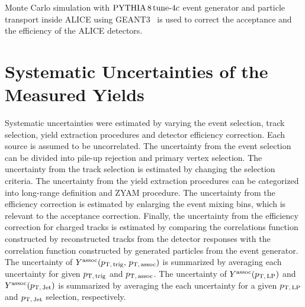 Monte Carlo simulation with $\mathrm{PYTHIA}\,8\,\mathrm{tune}{\text -}4c$ event generator and particle transport inside ALICE using GEANT3~\cite{Brun:1994aa} is used to correct the acceptance and the efficiency of the ALICE detectors. 


\section{Systematic Uncertainties of the Measured Yields}
\label{sec:uncertainties}
Systematic uncertainties were estimated by varying the event selection, track selection, yield extraction procedures and detector efficiency correction. Each source is assumed to be uncorrelated. The uncertainty from the event selection can be divided into pile-up rejection and primary vertex selection. The uncertainty from the track selection is estimated by changing the selection criteria. The uncertainty from the yield extraction procedures can be categorized into long-range definition and ZYAM procedure. The uncertainty from the efficiency correction is estimated by enlarging the event mixing bins, which is relevant to the acceptance correction.
Finally, the uncertainty from the efficiency correction for charged tracks is estimated by comparing the correlations function constructed by reconstructed tracks from the detector responses with the correlation function constructed by generated particles from the event generator.
The uncertainty of $Y^{\rm{assoc}}(p_\mathrm{T,\,trig},\,p_\mathrm{T,\,assoc})$ is summarized by averaging each uncertainty for given $p_\mathrm{T,\,trig}$ and $p_\mathrm{T,\,assoc}$. The uncertainty of $Y^{\rm{assoc}}(p_\mathrm{T,\,LP})$ and $Y^{\rm{assoc}}(p_\mathrm{T,\,Jet})$ is summarized by averaging the each uncertainty for a given $p_\mathrm{T,\,LP}$ and $p_\mathrm{T,\,Jet}$ selection, respectively.
